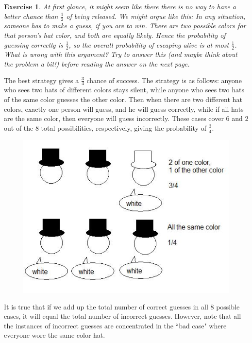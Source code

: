 \documentclass[12pt,twoside]{article}
\theoremstyle{norm}
\newtheorem{exr}[thm]{Exercise}
\newcommand{\rc}[1]{\frac{1}{#1}}
\begin{document}
\begin{exr}
At first glance, it might seem like there there is no way to have a better chance than $\rc 2$ of being released. We might argue like this: In any situation, someone has to make a guess, if you are to win. There are two possible colors for that person's hat color, and both are equally likely. Hence the probability of guessing correctly is $\rc 2$, so the overall probability of escaping alive is at most $\rc 2$. What is wrong with this argument? Try to answer this (and maybe think about the problem a bit!) before reading the answer on the next page.
\end{exr}
\pagebreak
The best strategy gives a $\frac 34$ chance of success. The strategy is as follows: anyone who sees two hats of different colors stays silent, while anyone who sees two hats of the same color guesses the other color. Then when there are two different hat colors, exactly one person will guess, and he will guess correctly, while if all hats are the same color, then everyone will guess incorrectly. These cases cover 6 and 2 out of the 8 total possibilities, respectively, giving the probability of $\frac 34$.

\begin{figure}[h!]
\centering
\includegraphics{hats}
\end{figure}

It is true that if we add up the total number of correct guesses in all 8 possible cases, it will equal the total number of incorrect guesses. However, note that all the instances of incorrect guesses are concentrated in the ``bad case" where everyone wore the same color hat.
\end{document}
